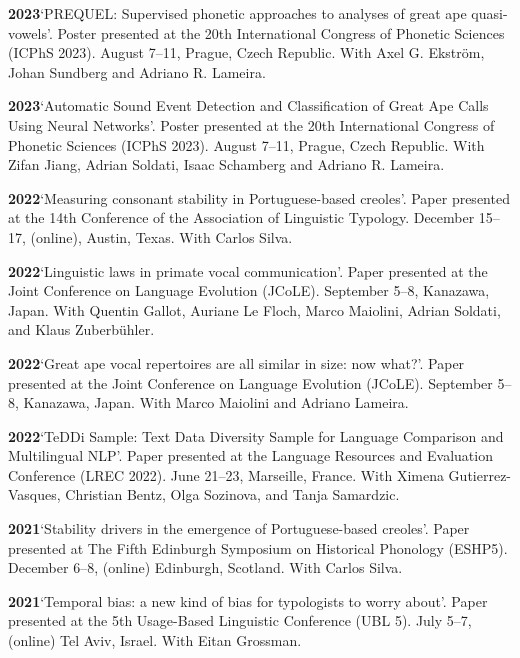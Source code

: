 \documentclass[11pt]{article}
\newcommand{\hangpara}{
 \setlength{\parindent}{0in} %
 \hangindent=0.42in %
}
\begin{document}
\hangpara
\vskip 6pt
{\bf 2023}\hspace{1ex}`PREQUEL: Supervised phonetic approaches to analyses of great ape quasi-vowels'. Poster presented at the 20th International Congress of Phonetic Sciences (ICPhS 2023). August 7--11, Prague, Czech Republic. With Axel G. Ekstr{\"o}m, Johan Sundberg and Adriano R. Lameira. 

\hangpara
\vskip 6pt
{\bf 2023}\hspace{1ex}`Automatic Sound Event Detection and Classification of Great Ape Calls Using Neural Networks'. Poster presented at the 20th International Congress of Phonetic Sciences (ICPhS 2023). August 7--11, Prague, Czech Republic. With Zifan Jiang, Adrian Soldati, Isaac Schamberg and Adriano R. Lameira.

\hangpara
\vskip 6pt
{\bf 2022}\hspace{1ex}`Measuring consonant stability in Portuguese-based creoles'. Paper presented at the 14th Conference of the Association of Linguistic Typology. December 15--17, (online), Austin, Texas. With Carlos Silva.

\hangpara
\vskip 6pt
{\bf 2022}\hspace{1ex}`Linguistic laws in primate vocal communication'. Paper presented at the Joint Conference on Language Evolution (JCoLE). September 5--8, Kanazawa, Japan. With Quentin Gallot, Auriane Le Floch, Marco Maiolini, Adrian Soldati, and Klaus Zuberbühler.

\hangpara
\vskip 6pt
{\bf 2022}\hspace{1ex}`Great ape vocal repertoires are all similar in size: now what?'. Paper presented at the Joint Conference on Language Evolution (JCoLE). September 5--8, Kanazawa, Japan. With Marco Maiolini and Adriano Lameira.

\hangpara
\vskip 6pt
{\bf 2022}\hspace{1ex}`TeDDi Sample: Text Data Diversity Sample for Language Comparison and Multilingual NLP'. Paper presented at the Language Resources and Evaluation Conference (LREC 2022). June 21--23, Marseille, France. With Ximena Gutierrez-Vasques, Christian Bentz, Olga Sozinova, and Tanja Samardzic.

\hangpara
\vskip 6pt
{\bf 2021}\hspace{1ex}`Stability drivers in the emergence of Portuguese-based creoles'. Paper presented at The Fifth Edinburgh Symposium on Historical Phonology (ESHP5). December 6--8, (online) Edinburgh, Scotland. With Carlos Silva.

\hangpara
\vskip 6pt
{\bf 2021}\hspace{1ex}`Temporal bias: a new kind of bias for typologists to worry about'. Paper presented at the 5th Usage-Based Linguistic Conference (UBL 5). July 5--7, (online) Tel Aviv, Israel. With Eitan Grossman.
\end{document}
